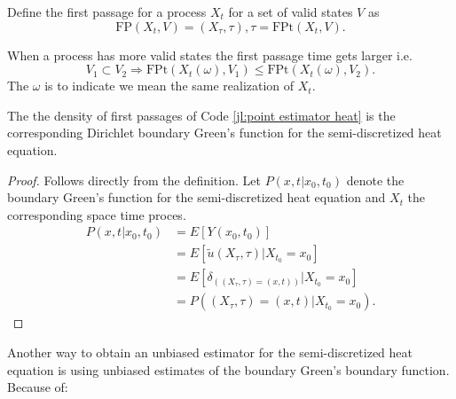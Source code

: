 \documentclass[a4paper,12pt]{article}
\begin{document}
\begin{definition} \label{def:first passage}
    Define the first passage for a process $X_{t}$ for a set of valid states
    $V$ as
    \begin{equation}
        \text{FP}(X_{t},V)=(X_{\tau},\tau), \tau = \text{FPt}(X_{t},V)
        .
    \end{equation}
\end{definition}

\begin{lemma} \label{lem: FP order}
    When a process has more valid states the first passage time gets larger i.e.
    \begin{equation}
        V_{1} \subset V_{2} \Rightarrow
        \text{FPt}(X_{t}(\omega),V_{1}) \le  \text{FPt}(X_{t}(\omega),V_{2}) .
    \end{equation}
    The $\omega$ is to indicate we mean the same realization of $X_{t}$.
\end{lemma}

\begin{theorem}
    The the density of first passages of Code \ref{jl:point estimator heat} is  the
    corresponding Dirichlet boundary Green's function for the semi-discretized heat equation.
\end{theorem}

\begin{proof}
    Follows directly from the definition.
    Let $P(x,t|x_{0},t_{0})$ denote the boundary Green's
    function for the semi-discretized heat equation and $X_{t}$
    the corresponding space time proces.
    \begin{align}
        P(x,t|x_{0},t_{0}) & = E[Y(x_0,t_0)]                                         \\
                           & = E[\tilde{u}(X_{\tau},\tau) | X_{t_0} = x_0 ]          \\
                           & = E[\delta_{((X_{\tau},\tau) = (x,t))}| X_{t_0} = x_0 ] \\
                           & = P((X_{\tau},\tau) = (x,t)| X_{t_0} = x_0 )
        .
    \end{align}
\end{proof}


Another way to obtain an unbiased estimator for the semi-discretized heat equation is using unbiased estimates
of the boundary Green's boundary function. Because of:
\end{document}
